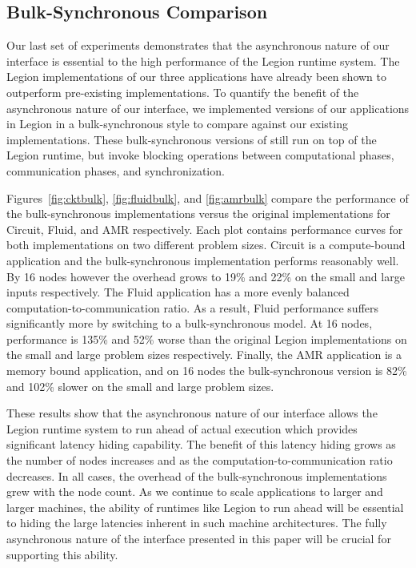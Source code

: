 

\subsection{Bulk-Synchronous Comparison}
\label{subsec:bulkcomp}

Our last set of experiments demonstrates that the asynchronous nature of our interface
is essential to the high performance of the Legion runtime system.  The Legion
implementations of our three applications have already been shown to outperform 
pre-existing implementations\cite{Legion12}.  To quantify the benefit of the asynchronous
nature of our interface, we implemented versions of our applications in
Legion in a bulk-synchronous style to compare against our existing implementations.  
These bulk-synchronous versions of still run on top of 
the Legion runtime, but invoke blocking operations between computational phases,
communication phases, and synchronization.

Figures~\ref{fig:cktbulk}, \ref{fig:fluidbulk}, and \ref{fig:amrbulk} compare
the performance of the bulk-synchronous implementations versus the original
implementations for Circuit, Fluid, and AMR respectively.  Each plot contains
performance curves for both implementations on two different problem sizes.
Circuit is a compute-bound application and the bulk-synchronous implementation
performs reasonably well.  By 16 nodes however the overhead grows to 19\%
and 22\% on the small and large inputs respectively.  The Fluid application 
has a more evenly balanced computation-to-communication ratio.  As a result,
Fluid performance suffers significantly more by switching to
a bulk-synchronous model.  At 16 nodes, performance is 135\% and 52\% worse
than the original Legion implementations on the small and large problem sizes
respectively.  Finally, the AMR application is a memory bound application, and on 16 nodes
the bulk-synchronous version is 82\% and 102\% slower on the small and
large problem sizes.

These results show that the asynchronous nature of our interface allows
the Legion runtime system to run ahead of actual execution which
provides significant latency hiding capability.  
The benefit of this latency hiding grows as the number of
nodes increases and as the computation-to-communication ratio decreases.
In all cases, the overhead of the bulk-synchronous
implementations grew with the node count.  As we continue to scale
applications to larger and larger machines, the ability of runtimes like Legion to run ahead
will be essential to hiding the large latencies inherent in such machine architectures.
The fully asynchronous nature of the interface presented in this paper
will be crucial for supporting this ability.


